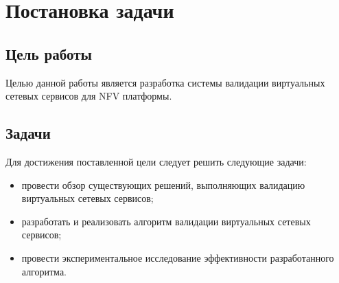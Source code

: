 \documentclass[oneside,final,14pt,a4paper]{extreport}
\begin{document}






\chapter{Постановка задачи}
\section{Цель работы}
Целью данной работы является разработка системы валидации виртуальных сетевых сервисов для NFV платформы. 
\section{Задачи}
Для достижения поставленной цели следует решить следующие задачи:
\begin{itemize}
    \item провести обзор существующих решений, выполняющих валидацию виртуальных сетевых сервисов;
    \item разработать и реализовать алгоритм валидации виртуальных сетевых сервисов;
    \item провести экспериментальное исследование эффективности разработанного алгоритма.
\end{itemize}
\end{document}
